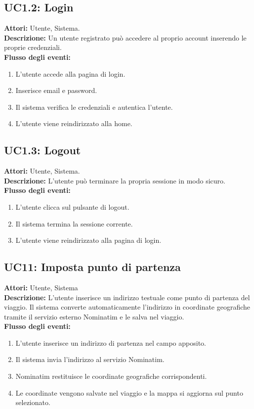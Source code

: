 \subsection*{UC1.2: Login}
\textbf{Attori:} Utente, Sistema. \\
\textbf{Descrizione:} Un utente registrato può accedere al proprio account inserendo le proprie credenziali. \\
\textbf{Flusso degli eventi:}
\begin{enumerate}
    \setlength{\itemsep}{0pt}
    \setlength{\parskip}{0pt}
    \item L'utente accede alla pagina di login.
    \item Inserisce email e password.
    \item Il sistema verifica le credenziali e autentica l'utente.
    \item L'utente viene reindirizzato alla home.
\end{enumerate}

\subsection*{UC1.3: Logout}
\textbf{Attori:} Utente, Sistema. \\
\textbf{Descrizione:} L'utente può terminare la propria sessione in modo sicuro. \\
\textbf{Flusso degli eventi:}
\begin{enumerate}
    \setlength{\itemsep}{0pt}
    \setlength{\parskip}{0pt}
    \item L'utente clicca sul pulsante di logout.
    \item Il sistema termina la sessione corrente.
    \item L'utente viene reindirizzato alla pagina di login.
\end{enumerate}

\subsection*{UC11: Imposta punto di partenza}
\textbf{Attori:} Utente, Sistema \\
\textbf{Descrizione:} L'utente inserisce un indirizzo testuale come punto di partenza del viaggio. Il sistema converte automaticamente l'indirizzo in coordinate geografiche tramite il servizio esterno Nominatim e le salva nel viaggio. \\
\textbf{Flusso degli eventi:}
\begin{enumerate}
    \setlength{\itemsep}{0pt}
    \setlength{\parskip}{0pt}
    \item L'utente inserisce un indirizzo di partenza nel campo apposito.
    \item Il sistema invia l'indirizzo al servizio Nominatim.
    \item Nominatim restituisce le coordinate geografiche corrispondenti.
    \item Le coordinate vengono salvate nel viaggio e la mappa si aggiorna sul punto selezionato.
\end{enumerate}

